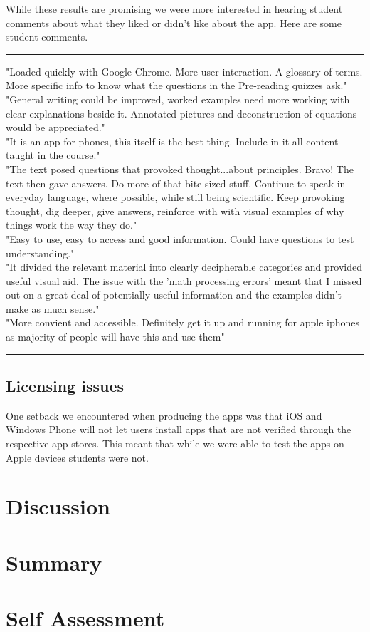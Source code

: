 \documentclass[12pt,a4paper]{article}  %
\begin{document}
While these results are promising we were more interested in hearing student comments about what they liked or didn't like about the app. Here are some student comments.

\rule[0.5ex]{1\columnwidth}{1pt}
"Loaded quickly with Google Chrome. More user interaction. A glossary of terms. More specific info to know what the questions in the Pre-reading quizzes ask."
\\[3mm]
"General writing could be improved, worked examples need more working with clear explanations beside it. Annotated pictures and deconstruction of equations would be appreciated."
\\[3mm]
"It is an app for phones, this itself is the best thing. Include in it all content taught in the course."
\\[3mm]
"The text posed questions that provoked thought...about principles. Bravo! The text then gave answers. Do more of that bite-sized stuff. Continue to speak in everyday language, where possible, while still being scientific. Keep provoking thought, dig deeper, give answers, reinforce with with visual examples of why things work the way they do."
\\[3mm]
"Easy to use, easy to access and good information. Could have questions to test understanding."
\\[3mm]
"It divided the relevant material into clearly decipherable categories and provided useful visual aid. The issue with the 'math processing errors' meant that I missed out on a great deal of potentially useful information and the examples didn't make as much sense."
\\[3mm]
"More convient and accessible. Definitely get it up and running for apple iphones as majority of people will have this and use them" \\
\rule[0.5ex]{1\columnwidth}{1pt}

\subsection{Licensing issues}

One setback we encountered when producing the apps was that iOS and Windows Phone will not let users install apps that are not verified through the respective app stores. This meant that while we were able to test the apps on Apple devices students were not.


\section{Discussion}

\section{Summary}

\section{Self Assessment}



\end{document}
